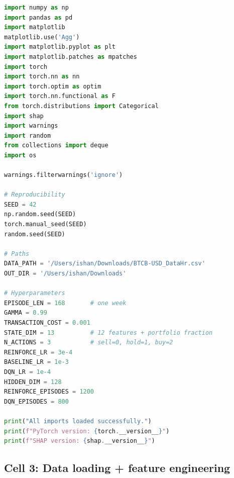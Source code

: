 \documentclass[11pt,a4paper]{article}
\begin{document}
\begin{lstlisting}[language=Python]
import numpy as np
import pandas as pd
import matplotlib
matplotlib.use('Agg')
import matplotlib.pyplot as plt
import matplotlib.patches as mpatches
import torch
import torch.nn as nn
import torch.optim as optim
import torch.nn.functional as F
from torch.distributions import Categorical
import shap
import warnings
import random
from collections import deque
import os

warnings.filterwarnings('ignore')

# Reproducibility
SEED = 42
np.random.seed(SEED)
torch.manual_seed(SEED)
random.seed(SEED)

# Paths
DATA_PATH = '/Users/ishan/Downloads/BTCB-USD_DataHr.csv'
OUT_DIR = '/Users/ishan/Downloads'

# Hyperparameters
EPISODE_LEN = 168       # one week
GAMMA = 0.99
TRANSACTION_COST = 0.001
STATE_DIM = 13          # 12 features + portfolio fraction
N_ACTIONS = 3           # sell=0, hold=1, buy=2
REINFORCE_LR = 3e-4
BASELINE_LR = 1e-3
DQN_LR = 1e-4
HIDDEN_DIM = 128
REINFORCE_EPISODES = 1200
DQN_EPISODES = 800

print("All imports loaded successfully.")
print(f"PyTorch version: {torch.__version__}")
print(f"SHAP version: {shap.__version__}")
\end{lstlisting}

\subsection*{Cell 3: Data loading + feature engineering}
\end{document}

